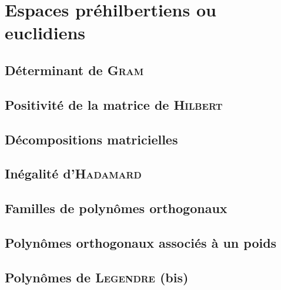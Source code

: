 \chapter{Espaces préhilbertiens ou euclidiens}



\newpage

\section{Déterminant de \textsc{Gram}} \label{matrice_gram}


\section{Positivité de la matrice de \textsc{Hilbert}}


\section{Décompositions matricielles}


\section{Inégalité d'\textsc{Hadamard}}


\section{Familles de polynômes orthogonaux}


\section{Polynômes orthogonaux associés à un poids}


\section{Polynômes de \textsc{Legendre} (bis)}


